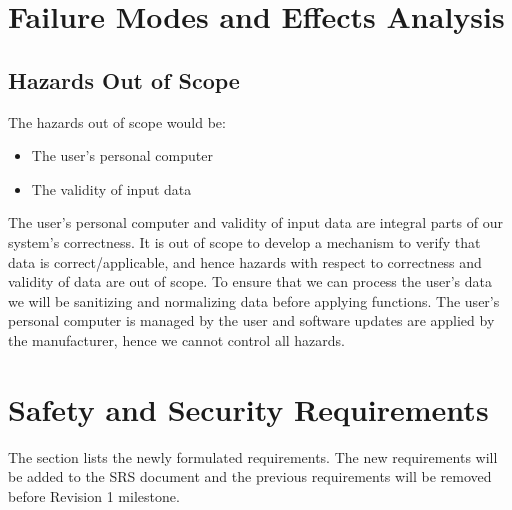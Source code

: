 \documentclass{article}
\begin{document}
\section{Failure Modes and Effects Analysis}
\subsection{Hazards Out of Scope}
The hazards out of scope would be:
\begin{itemize}
    \item The user's personal computer
    \item The validity of input data
\end{itemize}

\noindent The user's personal computer and validity of input data are integral parts of our system's correctness. It is out of scope to develop a mechanism to verify that data is correct/applicable, and hence hazards with respect to correctness and validity of data are out of scope. To ensure that we can process the user's data we will be sanitizing and normalizing data before applying functions. The user's personal computer is managed by the user and software updates are applied by the manufacturer, hence we cannot control all hazards. 

\section{Safety and Security Requirements}
The section lists the newly formulated requirements. The new requirements will be added to the SRS document and the previous requirements will be removed before Revision 1 milestone.
\end{document}
